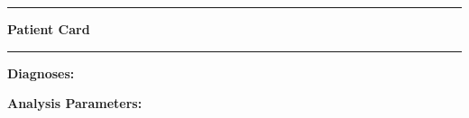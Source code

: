 \documentclass[12pt,a4paper]{article}
\begin{document}
\hrule
\begin{center}
    \Large\textbf{Patient Card}
\end{center}
\hrule

\vspace{1cm}




\vspace{1cm}



\vspace{0.5cm}

\begin{multicols}{2}

\justifying\textbf{Diagnoses:} \\


\columnbreak

\justifying\textbf{Analysis Parameters:} \\



\end{multicols}

\centering
\begin{tcolorbox}[colback=white,colframe=gray,title={\centering\textbf{Features kept:}}]
\centering

\end{tcolorbox}


% 

\vspace{1cm}



\vspace{1cm}


\end{document}
